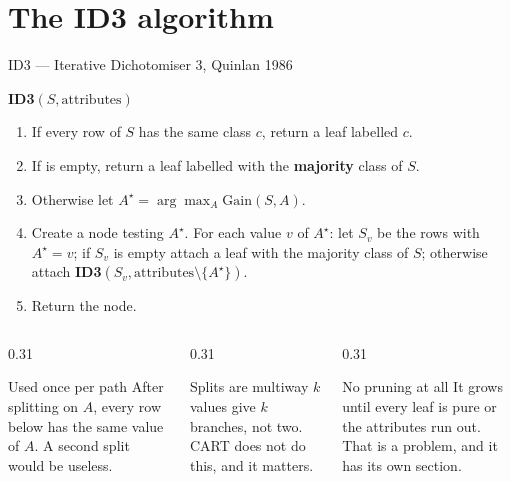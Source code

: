 \documentclass[aspectratio=169]{beamer}
\begin{document}
\section{The ID3 algorithm}
\label{sec:id3}

\begin{frame}[shrink=8]{ID3 --- Iterative Dichotomiser 3, Quinlan 1986}
  \begin{block}{\textbf{ID3}$(S, \text{attributes})$}
    \begin{enumerate}\small
      \item If every row of $S$ has the same class $c$, return a leaf
        labelled $c$.
      \item If  is empty, return a leaf labelled with the
        \textbf{majority} class of $S$.
      \item Otherwise let $A^\star = \arg\max_A \mathrm{Gain}(S, A)$.
      \item Create a node testing $A^\star$. For each value $v$ of $A^\star$:
        let $S_v$ be the rows with $A^\star = v$; if $S_v$ is empty attach a
        leaf with the majority class of $S$; otherwise attach
        \textbf{ID3}$(S_v, \text{attributes}\setminus\{A^\star\})$.
      \item Return the node.
    \end{enumerate}
  \end{block}
  \begin{columns}[T]
    \begin{column}{0.31\textwidth}
      \begin{alertblock}{Used once per path}
        \scriptsize After splitting on $A$, every row below has the same
        value of $A$. A second split would be useless.
      \end{alertblock}
    \end{column}
    \begin{column}{0.31\textwidth}
      \begin{alertblock}{Splits are multiway}
        \scriptsize $k$ values give $k$ branches, not two. CART does not do
        this, and it matters.
      \end{alertblock}
    \end{column}
    \begin{column}{0.31\textwidth}
      \begin{alertblock}{No pruning at all}
        \scriptsize It grows until every leaf is pure or the attributes run
        out. That is a problem, and it has its own section.
      \end{alertblock}
    \end{column}
  \end{columns}
\end{frame}
\end{document}
